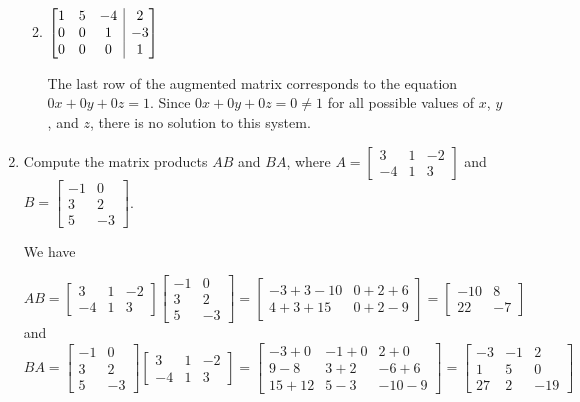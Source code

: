 \documentclass[12pt]{article}
\makeatletter
\newcommand{\points}[1]{\marginpar{\hspace{24pt}[#1]}}
\newenvironment{amatrix}[1]{%
  \left[\begin{array}{@{}*{#1}{c}|c@{}}
}{%
  \end{array}\right]
}
\makeatother
\begin{document}
\begin{enumerate}
\begin{enumerate}
\medskip



 \item $\begin{amatrix}{3}1&5&-4&2\\0&0&1&-3\\0&0&0&1\end{amatrix}$ 

\bigskip

The last row of the augmented matrix corresponds to the equation $0x+0y+0z=1$. Since $0x+0y+0z=0\neq 1$ for all possible values of $x$, $y$, and $z$, there is no solution to this system.
\end{enumerate}
 \newpage

\item Compute the matrix products $AB$ and $BA$, where $A = \begin{bmatrix}3&1&-2\\-4&1&3\end{bmatrix}$ and $B = \begin{bmatrix}-1&0\\3&2\\5&-3\end{bmatrix}$.\points{8}

\bigskip

We have

\[
 AB = \begin{bmatrix}3&1&-2\\-4&1&3\end{bmatrix}\begin{bmatrix}-1&0\\3&2\\5&-3\end{bmatrix} = \begin{bmatrix}-3+3-10&0+2+6\\4+3+15&0+2-9\end{bmatrix} = \begin{bmatrix}-10&8\\22&-7\end{bmatrix}
\]
and
\[
 BA = \begin{bmatrix}-1&0\\3&2\\5&-3\end{bmatrix}\begin{bmatrix}3&1&-2\\-4&1&3\end{bmatrix} = \begin{bmatrix}-3+0&-1+0&2+0\\9-8&3+2&-6+6\\15+12&5-3&-10-9\end{bmatrix} = \begin{bmatrix}-3&-1&2\\1&5&0\\27&2&-19\end{bmatrix}
\]



\end{enumerate}
\end{document}
